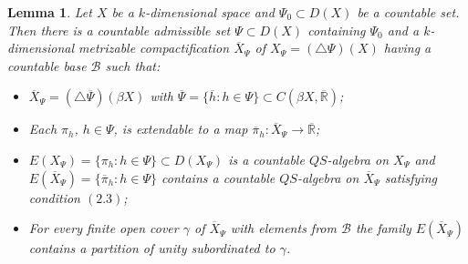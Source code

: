 \documentclass[12pt]{amsart}
\newtheorem{lem}[thm]{Lemma}
\begin{document}
\begin{lem}
Let $X$ be a $k$-dimensional space and $\Psi_0\subset D(X)$ be a countable set. Then there is a countable admissible set $\Psi\subset D(X)$ containing $\Psi_0$
and a $k$-dimensional metrizable compactification $\overline X_\Psi$ of $X_\Psi=(\triangle\Psi)(X)$ having a countable base $\mathcal B$ such that:
\begin{itemize}
\item $\overline X_\Psi=(\triangle\overline\Psi)(\beta X)$ with $\overline\Psi=\{\overline h:h\in\Psi\}\subset C(\beta X,\overline{\mathbb R})$;
\item Each $\pi_h$, $h\in\Psi$, is extendable to a map $\overline\pi_h:\overline X_\Psi\to\overline{\mathbb R}$; 
\item $E(X_\Psi)=\{\pi_h:h\in\Psi\}\subset D(X_\Psi)$ is a countable $QS$-algebra on $X_\Psi$ and $E(\overline X_\Psi)=\{\overline\pi_{h}:h\in\Psi\}$ contains a countable $QS$-algebra on $\overline X_\Psi$ satisfying condition $(2.3)$;
\item For every finite open cover $\gamma$ of $\overline X_\Psi$ with elements from $\mathcal B$ the family $E(\overline X_\Psi)$ contains a partition of unity subordinated to $\gamma$.
\end{itemize}
\end{lem}
\end{document}

